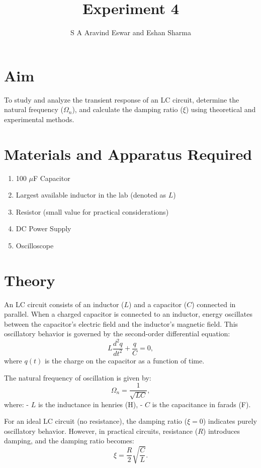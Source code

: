 \documentclass[journal]{IEEEtran}
\begin{document}

\vspace{3cm}

\title{Experiment 4} 
\author{S A Aravind Eswar and Eshan Sharma}
{\let\newpage\relax\maketitle}

\section{Aim}

To study and analyze the transient response of an LC circuit, determine the natural frequency (\(\Omega_n\)), and calculate the damping ratio (\(\xi\)) using theoretical and experimental methods.

\section{Materials and Apparatus Required}

\begin{enumerate}
	\item 100 $\mu$F Capacitor
	\item Largest available inductor in the lab (denoted as \(L\))
	\item Resistor (small value for practical considerations)
	\item DC Power Supply
	\item Oscilloscope
\end{enumerate}

\section{Theory}

An LC circuit consists of an inductor (\(L\)) and a capacitor (\(C\)) connected in parallel. When a charged capacitor is connected to an inductor, energy oscillates between the capacitor's electric field and the inductor's magnetic field. This oscillatory behavior is governed by the second-order differential equation:
\[
L \frac{d^2q}{dt^2} + \frac{q}{C} = 0,
\]
where \(q(t)\) is the charge on the capacitor as a function of time.

The natural frequency of oscillation is given by:
\[
\Omega_n = \frac{1}{\sqrt{LC}},
\]
where:
- \(L\) is the inductance in henries (H),
- \(C\) is the capacitance in farads (F).

For an ideal LC circuit (no resistance), the damping ratio (\(\xi = 0\)) indicates purely oscillatory behavior. However, in practical circuits, resistance (\(R\)) introduces damping, and the damping ratio becomes:
\[
\xi = \frac{R}{2} \sqrt{\frac{C}{L}}.
\]
\end{document}
